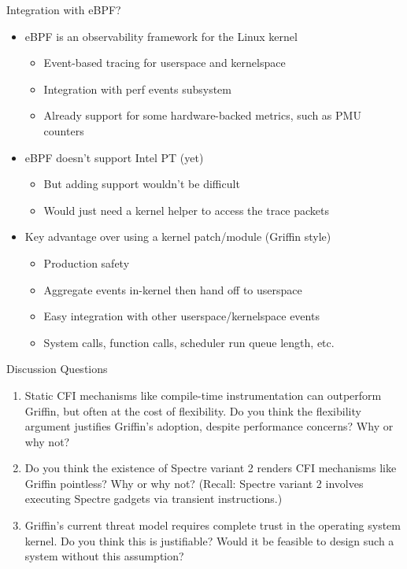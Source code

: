 \documentclass[12pt, dvipsnames, aspectratio=169]{beamer}
\begin{document}
\begin{frame}[c]{Integration with eBPF?}{}
  \begin{itemize}
    \item eBPF is an observability framework for the Linux kernel
    \begin{itemize}
      \item Event-based tracing for userspace and kernelspace
      \item Integration with perf events subsystem
      \item Already support for some hardware-backed metrics, such as PMU counters
    \end{itemize}

    \vfill
    \item eBPF doesn't support Intel PT (yet)
    \begin{itemize}
      \item But adding support wouldn't be difficult
      \item Would just need a kernel helper to access the trace packets
    \end{itemize}

    \vfill
    \item Key advantage over using a kernel patch/module (Griffin style)
    \begin{itemize}
      \item Production safety
      \item Aggregate events in-kernel then hand off to userspace
      \item Easy integration with other userspace/kernelspace events
      \item System calls, function calls, scheduler run queue length, etc.
    \end{itemize}
  \end{itemize}
\end{frame}

\begin{frame}[c]{Discussion Questions}{}
  \begin{enumerate}
    \item Static CFI mechanisms like compile-time instrumentation can outperform Griffin, but often at the cost of flexibility. Do you think the flexibility argument justifies Griffin's adoption, despite performance concerns? Why or why not?

    \vfill
    \item Do you think the existence of Spectre variant 2 renders CFI mechanisms like Griffin pointless? Why or why not? (Recall: Spectre variant 2 involves executing Spectre gadgets via transient instructions.)

    \vfill
    \item Griffin's current threat model requires complete trust in the operating system kernel. Do you think this is justifiable? Would it be feasible to design such a system without this assumption?
  \end{enumerate}
\end{frame}
\end{document}
